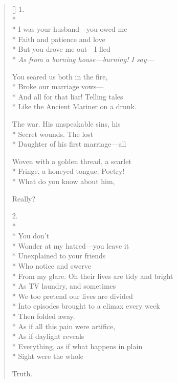 \label{ch:sheer_poetry}
\begin{verse}[\versewidth]
1.\\*
~\\*
I was your husband---you owed me\\*
Faith and patience and love\\*
But you drove me out---I fled\\*
\textit{As from a burning house---burning! I say---}

You seared us both in the fire,\\*
Broke our marriage vows---\\*
And all for that liar! Telling tales\\*
Like the Ancient Mariner on a drunk.

The war. His unspeakable sins, his\\*
Secret wounds. The lost \\*
Daughter of his first marriage---all

Woven with a golden thread, a scarlet\\*
Fringe, a honeyed tongue. Poetry!\\*
What do you know about him,

Really?

2.\\*
~\\*
You don't\\*
Wonder at my hatred---you leave it\\*
Unexplained to your friends\\*
Who notice and swerve\\*
From my glare.  Oh their lives are tidy and bright\\*
As TV laundry, and sometimes\\*
We too pretend our lives are divided\\*
Into episodes brought to a climax every week\\*
Then folded away.\\*
As if all this pain were artifice, \\*
As if daylight reveals\\*
Everything, as if what happens in plain \\*
Sight were the whole

Truth.


\end{verse}
